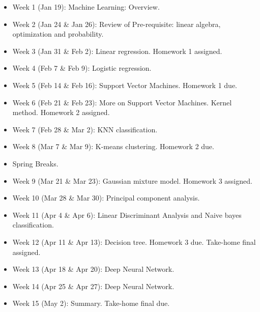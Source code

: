 \documentclass[a4paper,10pt]{article}
\begin{document}
\begin{itemize}
\item Week 1 (Jan 19): Machine Learning: Overview. 

\item Week 2 (Jan 24 \& Jan 26): Review of Pre-requisite: linear algebra, optimization and probability. 

\item Week 3 (Jan 31 \& Feb 2): Linear regression. Homework 1 assigned. 

\item Week 4 (Feb 7 \& Feb 9): Logistic regression. 

\item Week 5 (Feb 14 \& Feb 16): Support Vector Machines. Homework 1 due. 

\item Week 6 (Feb 21 \& Feb 23): More on Support Vector Machines. Kernel method. Homework 2 assigned.

\item Week 7 (Feb 28 \& Mar 2): KNN classification. 

\item Week 8 (Mar 7 \& Mar 9): K-means clustering.  Homework 2 due. 

\item Spring Breaks.

\item Week 9 (Mar 21 \& Mar 23):  Gaussian mixture model. Homework 3 assigned.

\item Week 10 (Mar 28 \& Mar 30): Principal component analysis. 

\item Week 11 (Apr 4 \& Apr 6):  Linear Discriminant Analysis and Naive bayes classification. 

\item Week 12 (Apr 11 \& Apr 13): Decision tree.  Homework 3 due. Take-home final assigned.

\item Week 13 (Apr 18 \& Apr 20): Deep Neural Network.

\item Week 14 (Apr 25 \& Apr 27): Deep Neural Network.

\item Week 15 (May 2): Summary. Take-home final due. 
 
\end{itemize}
\end{document}
